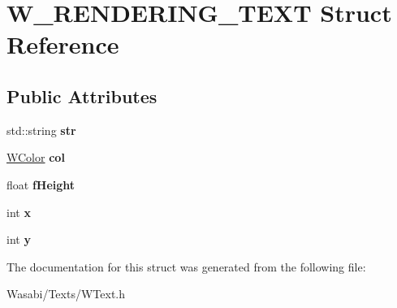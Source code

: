 \hypertarget{struct_w___r_e_n_d_e_r_i_n_g___t_e_x_t}{}\section{W\+\_\+\+R\+E\+N\+D\+E\+R\+I\+N\+G\+\_\+\+T\+E\+XT Struct Reference}
\label{struct_w___r_e_n_d_e_r_i_n_g___t_e_x_t}
\subsection*{Public Attributes}
\begin{DoxyCompactItemize}
\item 
std\+::string {\bfseries str}\hypertarget{struct_w___r_e_n_d_e_r_i_n_g___t_e_x_t_a6e33f0f43a0f769caf5bf09de1d67cff}{}\label{struct_w___r_e_n_d_e_r_i_n_g___t_e_x_t_a6e33f0f43a0f769caf5bf09de1d67cff}

\item 
\hyperlink{class_w_color}{W\+Color} {\bfseries col}\hypertarget{struct_w___r_e_n_d_e_r_i_n_g___t_e_x_t_a94e310a92f39f1d4e0daa86b8affdb7d}{}\label{struct_w___r_e_n_d_e_r_i_n_g___t_e_x_t_a94e310a92f39f1d4e0daa86b8affdb7d}

\item 
float {\bfseries f\+Height}\hypertarget{struct_w___r_e_n_d_e_r_i_n_g___t_e_x_t_a0560a22b80dd517ec081d90ee03a43e1}{}\label{struct_w___r_e_n_d_e_r_i_n_g___t_e_x_t_a0560a22b80dd517ec081d90ee03a43e1}

\item 
int {\bfseries x}\hypertarget{struct_w___r_e_n_d_e_r_i_n_g___t_e_x_t_ab538b386bcacb874986397e2109f1c86}{}\label{struct_w___r_e_n_d_e_r_i_n_g___t_e_x_t_ab538b386bcacb874986397e2109f1c86}

\item 
int {\bfseries y}\hypertarget{struct_w___r_e_n_d_e_r_i_n_g___t_e_x_t_af24246ee5733da8d0d4a4b8653fed020}{}\label{struct_w___r_e_n_d_e_r_i_n_g___t_e_x_t_af24246ee5733da8d0d4a4b8653fed020}

\end{DoxyCompactItemize}


The documentation for this struct was generated from the following file\+:\begin{DoxyCompactItemize}
\item 
Wasabi/\+Texts/W\+Text.\+h\end{DoxyCompactItemize}
